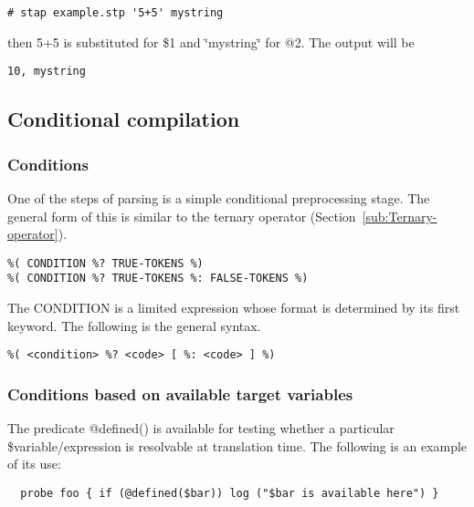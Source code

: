 \documentclass[twoside,english]{article}
\newenvironment{vindent}
{\begin{list}{}{\setlength{\listparindent}{6pt}}
\item[]}
{\end{list}}
\begin{document}
\begin{vindent}
\begin{verbatim}
# stap example.stp '5+5' mystring
\end{verbatim}
\end{vindent}
then 5+5 is substituted for \$1 and \char`\"{}mystring\char`\"{} for @2. The
output will be

\begin{vindent}
\begin{verbatim}
10, mystring
\end{verbatim}
\end{vindent}

\subsection{Conditional compilation}


\subsubsection{Conditions}
One of the steps of parsing is a simple conditional preprocessing stage.
The general form of this is similar to the ternary operator (Section~\ref{sub:Ternary-operator}).

\begin{vindent}
\begin{verbatim}
%( CONDITION %? TRUE-TOKENS %)
%( CONDITION %? TRUE-TOKENS %: FALSE-TOKENS %)
\end{verbatim}
\end{vindent}
The CONDITION is a limited expression whose format is determined by its first
keyword. The following is the general syntax.

\begin{vindent}
\begin{verbatim}
%( <condition> %? <code> [ %: <code> ] %)
\end{verbatim}
\end{vindent}

\subsubsection{Conditions based on available target variables}
The predicate @defined() is available for testing whether a
particular \$variable/expression is resolvable at translation time. The
following is an example of its use:

\begin{vindent}
\begin{verbatim}
  probe foo { if (@defined($bar)) log ("$bar is available here") }
\end{verbatim}
\end{vindent}
\end{document}
